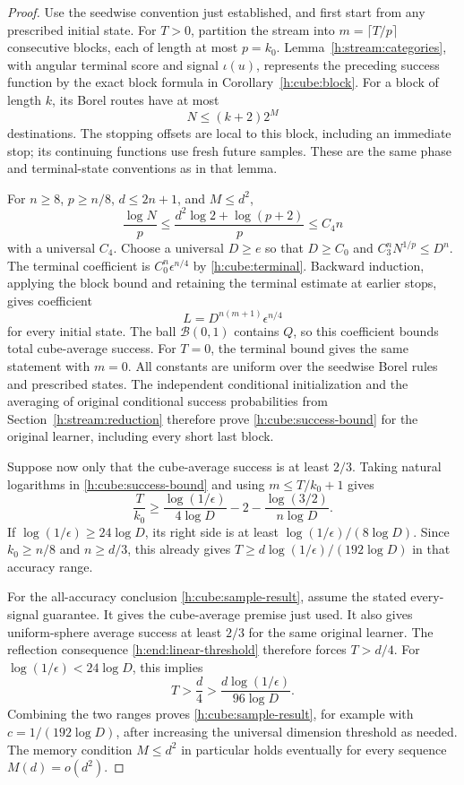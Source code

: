 \begin{proof}
Use the seedwise convention just established, and first start from any
prescribed initial state.  For \(T>0\), partition the stream into
\(m=\lceil T/p\rceil\) consecutive blocks, each of length at most
\(p=k_0\).  Lemma~\ref{h:stream:categories}, with angular terminal
score and signal \(\iota(u)\), represents the preceding success
function by the exact block formula in Corollary~\ref{h:cube:block}.
For a block of length \(k\), its Borel routes have at most
\begin{equation}\label{h:cube:destinations}
 N\le(k+2)2^M
\end{equation}
destinations.  The stopping offsets are local to this block, including
an immediate stop; its continuing functions use fresh future samples.
These are the same phase and terminal-state conventions as in that
lemma.

For \(n\ge8\), \(p\ge n/8\), \(d\le2n+1\), and \(M\le d^2\),
\[
 \frac{\log N}{p}
 \le\frac{d^2\log2+\log(p+2)}p\le C_4n
\]
with a universal \(C_4\).  Choose a universal \(D\ge e\) so that
\(D\ge C_0\) and \(C_3^nN^{1/p}\le D^n\).
The terminal coefficient is \(C_0^n\epsilon^{n/4}\) by
\eqref{h:cube:terminal}.  Backward induction, applying the block bound
and retaining the terminal estimate at earlier stops, gives coefficient
\[
 L=D^{n(m+1)}\epsilon^{n/4}
\]
for every initial state.  The ball \(\mathcal B(0,1)\) contains \(Q\),
so this coefficient bounds total cube-average success.  For \(T=0\),
the terminal bound gives the same statement with \(m=0\).
All constants are uniform over the seedwise Borel rules and prescribed
states.  The independent conditional initialization and the averaging
of original conditional success probabilities from
Section~\ref{h:stream:reduction} therefore prove
\eqref{h:cube:success-bound} for the original learner, including every
short last block.

Suppose now only that the cube-average success is at least \(2/3\).
Taking natural logarithms in \eqref{h:cube:success-bound} and using
\(m\le T/k_0+1\) gives
\begin{equation}\label{h:cube:sample-bound}
 \frac{T}{k_0}
 \ge\frac{\log(1/\epsilon)}{4\log D}
       -2-\frac{\log(3/2)}{n\log D}.
\end{equation}
If \(\log(1/\epsilon)\ge24\log D\), its right side is at least
\(\log(1/\epsilon)/(8\log D)\).  Since \(k_0\ge n/8\) and
\(n\ge d/3\), this already gives
\(T\ge d\log(1/\epsilon)/(192\log D)\) in that accuracy range.

For the all-accuracy conclusion \eqref{h:cube:sample-result}, assume
the stated every-signal guarantee.  It gives the cube-average premise
just used.  It also gives uniform-sphere average success at least
\(2/3\) for the same original learner.  The reflection consequence
\eqref{h:end:linear-threshold} therefore forces \(T>d/4\).
For \(\log(1/\epsilon)<24\log D\), this implies
\[
 T>\frac d4>\frac{d\log(1/\epsilon)}{96\log D}.
\]
Combining the two ranges proves \eqref{h:cube:sample-result}, for
example with \(c=1/(192\log D)\), after increasing the universal
dimension threshold as needed.  The memory condition \(M\le d^2\)
in particular holds eventually for every sequence \(M(d)=o(d^2)\).
\end{proof}

